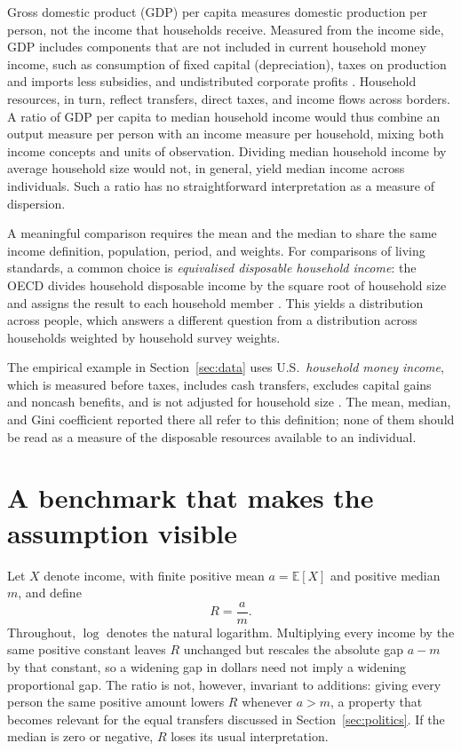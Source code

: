 \documentclass[11pt,a4paper]{article}
\begin{document}
Gross domestic product (GDP) per capita measures domestic production per person, not the income that households receive. Measured from the income side, GDP includes components that are not included in current household money income, such as consumption of fixed capital (depreciation), taxes on production and imports less subsidies, and undistributed corporate profits \cite{bea}. Household resources, in turn, reflect transfers, direct taxes, and income flows across borders. A ratio of GDP per capita to median household income would thus combine an output measure per person with an income measure per household, mixing both income concepts and units of observation. Dividing median household income by average household size would not, in general, yield median income across individuals. Such a ratio has no straightforward interpretation as a measure of dispersion.

A meaningful comparison requires the mean and the median to share the same income definition, population, period, and weights. For comparisons of living standards, a common choice is \emph{equivalised disposable household income}: the OECD divides household disposable income by the square root of household size and assigns the result to each household member \cite{oecd}. This yields a distribution across people, which answers a different question from a distribution across households weighted by household survey weights.

The empirical example in Section~\ref{sec:data} uses U.S.\ \emph{household money income}, which is measured before taxes, includes cash transfers, excludes capital gains and noncash benefits, and is not adjusted for household size \cite{census}. The mean, median, and Gini coefficient reported there all refer to this definition; none of them should be read as a measure of the disposable resources available to an individual.


\section{A benchmark that makes the assumption visible}
\label{sec:benchmark}

Let $X$ denote income, with finite positive mean $a=\mathbb{E}[X]$ and positive median $m$, and define
\begin{equation}
R=\frac{a}{m}.
\label{eq:ratio}
\end{equation}
Throughout, $\log$ denotes the natural logarithm. Multiplying every income by the same positive constant leaves $R$ unchanged but rescales the absolute gap $a-m$ by that constant, so a widening gap in dollars need not imply a widening proportional gap. The ratio is not, however, invariant to additions: giving every person the same positive amount lowers $R$ whenever $a>m$, a property that becomes relevant for the equal transfers discussed in Section~\ref{sec:politics}. If the median is zero or negative, $R$ loses its usual interpretation.
\end{document}
